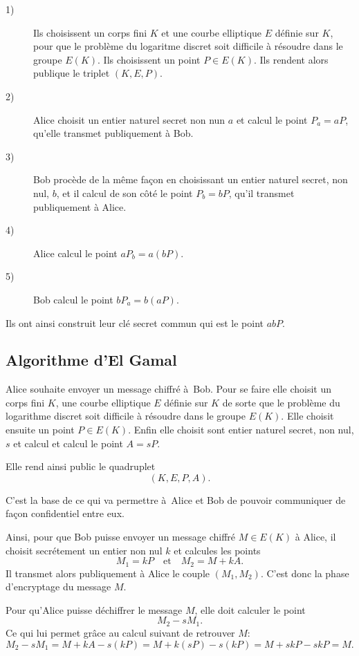 \begin{description}
    \item[1)] Ils choisissent un corps fini $K$ et une courbe elliptique $E$ définie sur $K$, pour que le problème du logaritme discret soit difficile à résoudre dans le groupe $E(K)$. Ils choisissent un point $P \in E(K)$. Ils rendent alors publique le triplet $(K,E,P)$.

    \item[2)] Alice choisit un entier naturel secret non nun $a$ et calcul le point $P_a=aP$, qu'elle transmet publiquement à Bob.

    \item[3)] Bob procède de la même façon en choisissant un entier naturel secret, non nul, $b$, et il calcul de son côté le point $P_b=bP$, qu'il transmet publiquement à Alice.

    \item[4)] Alice calcul le point $aP_b=a(bP)$.

    \item[5)] Bob calcul le point $bP_a=b(aP)$.
\end{description}

Ils ont ainsi construit leur clé secret commun qui est le point $abP$.

\subsection{Algorithme d'El Gamal}

Alice souhaite envoyer un message chiffré à Bob. Pour se faire elle choisit un corps fini $K$, une courbe elliptique $E$ définie sur $K$ de sorte que le problème du logarithme discret soit difficile à résoudre dans le groupe $E(K)$. Elle choisit ensuite un point $P \in E(K)$. Enfin elle choisit sont entier naturel secret, non nul, $s$ et calcul et calcul le point $A=sP$.

Elle rend ainsi public le quadruplet 
\[
    (K,E,P,A)
.\] 

C'est la base de ce qui va permettre à Alice et Bob de pouvoir communiquer de façon confidentiel entre eux.

Ainsi, pour que Bob puisse envoyer un message chiffré $M \in E(K)$ à Alice, il choisit secrétement un entier non nul $k$ et calcules les points
\[
M_1=kP \quad \text{et} \quad M_2=M+kA
.\] 
Il transmet alors publiquement à Alice le couple $(M_1,M_2)$. C'est donc la phase d'encryptage du message $M$.

Pour qu'Alice puisse déchiffrer le message $M$, elle doit calculer le point
\[
M_2-sM_1
.\] 
Ce qui lui permet grâce au calcul suivant de retrouver $M$:
\[
M_2-sM_1=M+kA-s(kP)=M+k(sP)-s(kP)=M+skP-skP=M
.\] 


